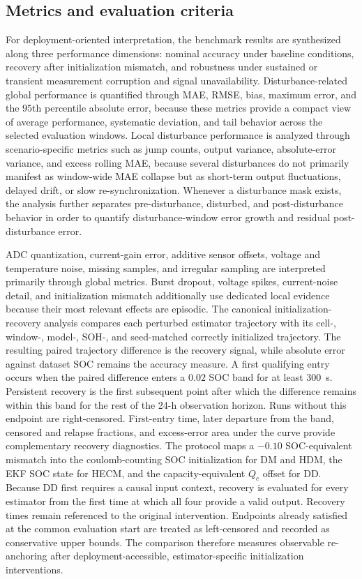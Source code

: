 \documentclass[review,nopreprintline]{elsarticle}
\begin{document}
\subsection{Metrics and evaluation criteria}
For deployment-oriented interpretation, the benchmark results are synthesized along three performance dimensions: nominal accuracy under baseline conditions, recovery after initialization mismatch, and robustness under sustained or transient measurement corruption and signal unavailability. Disturbance-related global performance is quantified through MAE, RMSE, bias, maximum error, and the $95$th percentile absolute error, because these metrics provide a compact view of average performance, systematic deviation, and tail behavior across the selected evaluation windows. Local disturbance performance is analyzed through scenario-specific metrics such as jump counts, output variance, absolute-error variance, and excess rolling MAE, because several disturbances do not primarily manifest as window-wide MAE collapse but as short-term output fluctuations, delayed drift, or slow re-synchronization. Whenever a disturbance mask exists, the analysis further separates pre-disturbance, disturbed, and post-disturbance behavior in order to quantify disturbance-window error growth and residual post-disturbance error.

ADC quantization, current-gain error, additive sensor offsets, voltage and temperature noise, missing samples, and irregular sampling are interpreted primarily through global metrics. Burst dropout, voltage spikes, current-noise detail, and initialization mismatch additionally use dedicated local evidence because their most relevant effects are episodic. The canonical initialization-recovery analysis compares each perturbed estimator trajectory with its cell-, window-, model-, SOH-, and seed-matched correctly initialized trajectory. The resulting paired trajectory difference is the recovery signal, while absolute error against dataset SOC remains the accuracy measure. A first qualifying entry occurs when the paired difference enters a $0.02$ SOC band for at least $300$~s. Persistent recovery is the first subsequent point after which the difference remains within this band for the rest of the 24-h observation horizon. Runs without this endpoint are right-censored. First-entry time, later departure from the band, censored and relapse fractions, and excess-error area under the curve provide complementary recovery diagnostics. The protocol maps a $-0.10$ SOC-equivalent mismatch into the coulomb-counting SOC initialization for DM and HDM, the EKF SOC state for HECM, and the capacity-equivalent $Q_c$ offset for DD. Because DD first requires a causal input context, recovery is evaluated for every estimator from the first time at which all four provide a valid output. Recovery times remain referenced to the original intervention. Endpoints already satisfied at the common evaluation start are treated as left-censored and recorded as conservative upper bounds. The comparison therefore measures observable re-anchoring after deployment-accessible, estimator-specific initialization interventions.
\end{document}
